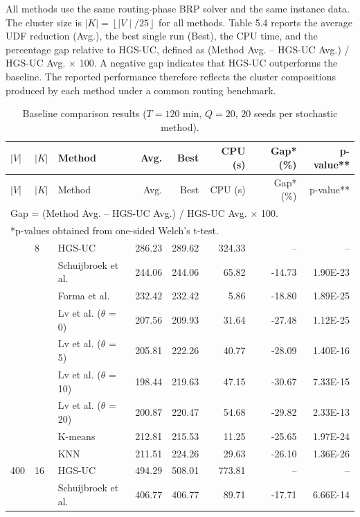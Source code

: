 \documentclass[11pt]{article}
\numberwithin{table}{section}
\numberwithin{figure}{section}
\begin{document}
All methods use the same routing-phase BRP solver and the same instance data. The cluster size is $\left| K \right|=\left\lfloor \mid V\mid /25 \right\rfloor $ for all methods. Table 5.4 reports the average UDF reduction (Avg.), the best single run (Best), the CPU time, and the percentage gap relative to HGS-UC, defined as (Method Avg. – HGS-UC Avg.) / HGS-UC Avg. × 100. A negative gap indicates that HGS-UC outperforms the baseline. The reported performance therefore reflects the cluster compositions produced by each method under a common routing benchmark.

\begin{landscape}
\begin{longtable}{llp{4.3cm}rrrrr}
\caption{Baseline comparison results ($T=120$ min, $Q=20$, 20 seeds per stochastic method).}\label{tab:baseline-default}\\
\toprule
$|V|$ & $|K|$ & Method & Avg. & Best & CPU (s) & Gap* (\%) & p-value** \\
\midrule
\endfirsthead
\toprule
$|V|$ & $|K|$ & Method & Avg. & Best & CPU (s) & Gap* (\%) & p-value** \\
\midrule
\endhead
\bottomrule
\multicolumn{8}{l}{\footnotesize *Gap = (Method Avg. -- HGS-UC Avg.) / HGS-UC Avg. $\times$ 100.}\\
\multicolumn{8}{l}{\footnotesize **p-values obtained from one-sided Welch's t-test.}\\
\endfoot
200 & 8 & HGS-UC & 286.23 & 289.62 & 324.33 & -- & -- \\
 &  & Schuijbroek et al. & 244.06 & 244.06 & 65.82 & -14.73 & 1.90E-23 \\
 &  & Forma et al. & 232.42 & 232.42 & 5.86 & -18.80 & 1.89E-25 \\
 &  & Lv et al. ($\theta$ = 0) & 207.56 & 209.93 & 31.64 & -27.48 & 1.12E-25 \\
 &  & Lv et al. ($\theta$ = 5) & 205.81 & 222.26 & 40.77 & -28.09 & 1.40E-16 \\
 &  & Lv et al. ($\theta$ = 10) & 198.44 & 219.63 & 47.15 & -30.67 & 7.33E-15 \\
 &  & Lv et al. ($\theta$ = 20) & 200.87 & 220.47 & 54.68 & -29.82 & 2.33E-13 \\
 &  & K-means & 212.81 & 215.53 & 11.25 & -25.65 & 1.97E-24 \\
 &  & KNN & 211.51 & 224.26 & 29.63 & -26.10 & 1.36E-26 \\
\midrule
400 & 16 & HGS-UC & 494.29 & 508.01 & 773.81 & -- & -- \\
 &  & Schuijbroek et al. & 406.77 & 406.77 & 89.71 & -17.71 & 6.66E-14 \\

\end{longtable}
\end{landscape}
\end{document}
